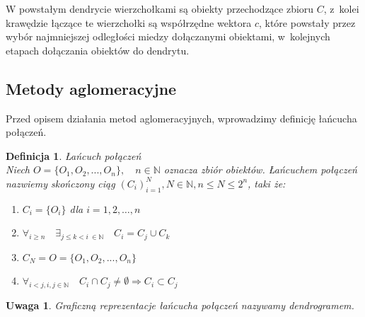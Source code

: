 \documentclass[12pt,a4paper]{report}
\newtheorem{definition}[theorem]{Definicja}
\newtheorem{uwaga}{Uwaga}
\begin{document}
W powstałym dendrycie wierzchołkami są obiekty przechodzące zbioru $C$, z~kolei krawędzie łączące te wierzchołki są współrzędne wektora $c$, które powstały przez wybór najmniejszej odległości miedzy dołączanymi obiektami, w~kolejnych etapach dołączania obiektów do dendrytu. 

\subsection{Metody aglomeracyjne}

Przed opisem działania metod aglomeracyjnych, wprowadzimy definicję łańcucha połączeń.

\begin{definition}{Łańcuch połączeń}\\
Niech $O=\{O_{1},O_{2},..., O_{n}\}, \quad n\in \mathbb{N}$ oznacza zbiór obiektów. Łańcuchem połączeń nazwiemy skończony ciąg $(C_{i})_{i=1}^{N},  N \in \mathbb{N}, n\leq N \leq 2^n$, taki że:
\begin{enumerate}
\item $C_{i}=\{O_{i}\}$ dla $i=1, 2, \ldots, n$
\item $\forall_{i\geq n} \quad \exists_{j\leq k < i~\in \mathbb{N}} \quad C_{i}=C_{j} \cup C_{k}$
\item $C_{N}=O=\{O_{1},O_{2},..., O_{n}\}$
\item $\forall_{i<j,  {i,j \in \mathbb{N}}} \quad C_{i} \cap C_{j} \neq \emptyset \Rightarrow  C_{i} \subset C_{j}$ 
\end{enumerate}
\end{definition}

\begin{uwaga}
Graficzną reprezentacje łańcucha połączeń nazywamy dendrogramem. 
\end{uwaga}
\end{document}
